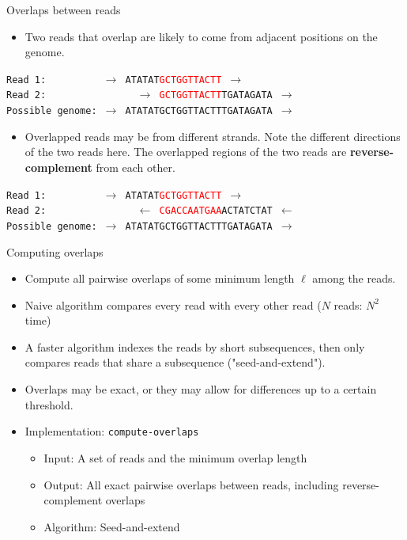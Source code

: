 \documentclass[xcolor=dvipsnames]{beamer}
\begin{document}
\begin{frame}{Overlaps between reads}

	\begin{itemize}
	\item Two reads that overlap are likely to come from adjacent positions on the genome.
	\end{itemize}

	{\tt Read 1: \ \ \ \ \ \ \ \ \ $\rightarrow$ ATATAT\textcolor{red}{GCTGGTTACTT} $\rightarrow$ } \\
	{\tt Read 2: \ \ \ \ \ \ \ \ \ \ \ \ \ \ \ 
		$\rightarrow$ \textcolor{red}{GCTGGTTACTT}TGATAGATA $\rightarrow$ } \\
	{\tt Possible genome: $\rightarrow$ ATATATGCTGGTTACTTTGATAGATA $\rightarrow$}

	\begin{itemize}
	\item Overlapped reads may be from different strands.  Note the different
	directions of the two reads here.  The overlapped regions of the two reads
	are {\bf reverse-complement} from each other.
	\end{itemize}

	{\tt Read 1: \ \ \ \ \ \ \ \ \ 
			$\rightarrow$ ATATAT\textcolor{red}{GCTGGTTACTT} $\rightarrow$ } \\
	{\tt Read 2: \ \ \ \ \ \ \ \ \ \ \ \ \ \ \ 
			$\leftarrow$ \textcolor{red}{CGACCAATGAA}ACTATCTAT $\leftarrow$ } \\
	{\tt Possible genome: $\rightarrow$ ATATATGCTGGTTACTTTGATAGATA $\rightarrow$}
\end{frame}


\begin{frame}{Computing overlaps}
	\begin{itemize}
		\item Compute all pairwise overlaps of some minimum length $\ell$ among the
		reads.
		\item Naive algorithm compares every read with every other read ($N$
		reads: $N^2$ time)
		\item A faster algorithm indexes the reads by short subsequences, then only
		compares reads that share a subsequence ("seed-and-extend").
		\item Overlaps may be exact, or they may allow for differences up to a
		certain threshold.
		\item Implementation: {\tt compute-overlaps}
			\begin{itemize}
				\item Input:  A set of reads and the minimum overlap length
				\item Output:  All exact pairwise overlaps between reads,
				including reverse-complement overlaps
				\item Algorithm:  Seed-and-extend
			\end{itemize}
	\end{itemize}
\end{frame}
\end{document}
